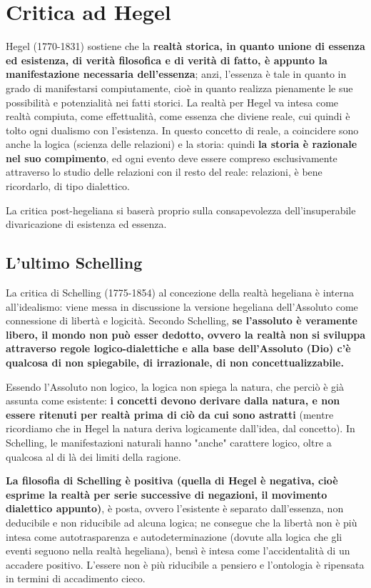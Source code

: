 \chapter{Critica ad Hegel}
\bigskip


Hegel (1770-1831) sostiene che la \textbf{realtà storica, in quanto unione di essenza ed esistenza, di verità filosofica e di verità di fatto, è appunto la manifestazione necessaria dell'essenza}; anzi, l'essenza è tale in quanto in grado di manifestarsi compiutamente, cioè in quanto realizza pienamente le sue possibilità e potenzialità nei fatti storici. La realtà per Hegel va intesa come realtà compiuta, come effettualità, come essenza che diviene reale, cui quindi è tolto ogni dualismo con l'esistenza. In questo concetto di reale, a coincidere sono anche la logica (scienza delle relazioni) e la storia: quindi \textbf{la storia è razionale nel suo compimento}, ed ogni evento deve essere compreso esclusivamente attraverso lo studio delle relazioni con il resto del reale: relazioni, è bene ricordarlo,  di tipo dialettico.

La critica post-hegeliana si baserà proprio sulla consapevolezza dell'insuperabile divaricazione di esistenza ed essenza.

\section{L'ultimo Schelling}

La critica di Schelling (1775-1854) al concezione della realtà hegeliana è interna all'idealismo: viene messa in discussione la versione hegeliana dell'Assoluto come connessione di libertà e logicità. Secondo Schelling, \textbf{se l'assoluto è veramente libero, il mondo non può esser dedotto, ovvero la realtà non si sviluppa attraverso regole logico-dialettiche  e alla base dell'Assoluto (Dio) c'è qualcosa di non spiegabile, di irrazionale, di non concettualizzabile.}

Essendo l'Assoluto non logico, la logica non spiega la natura, che perciò è già assunta come esistente: \textbf{i concetti devono derivare dalla natura, e non essere ritenuti per realtà prima di ciò da cui sono astratti} (mentre ricordiamo che in Hegel la natura deriva logicamente dall'idea, dal concetto). In Schelling, le manifestazioni naturali hanno "anche" carattere logico, oltre a qualcosa al di là dei limiti della ragione.

\textbf{La filosofia di Schelling è positiva (quella di Hegel è negativa, cioè esprime la realtà per serie successive di negazioni, il movimento dialettico appunto)}, è posta, ovvero l'esistente è separato dall'essenza, non deducibile e non riducibile ad alcuna logica; ne consegue che la libertà non è più intesa come autotrasparenza e autodeterminazione (dovute alla logica che gli eventi seguono nella realtà hegeliana), bensì è intesa come l'accidentalità di un accadere positivo. L'essere non è più riducibile a pensiero e l'ontologia è ripensata in termini di accadimento cieco.


